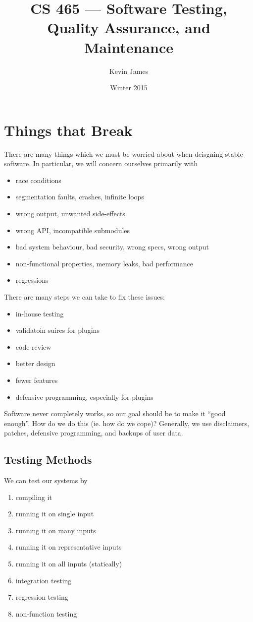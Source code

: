 \documentclass[12pt]{article}
\begin{document}
\title{CS 465 --- Software Testing, Quality Assurance, and Maintenance}
\author{Kevin James}
\date{\vspace{-2ex}Winter 2015}
\maketitle\HRule

\tableofcontents
\newpage

\section{Things that Break}
There are many things which we must be worried about when deisgning stable software. In particular, we will concern ourselves primarily with
\begin{itemize}
\item race conditions
\item segmentation faults, crashes, infinite loops
\item wrong output, unwanted side-effects
\item wrong API, incompatible submodules
\item bad system behaviour, bad security, wrong specs, wrong output
\item non-functional properties, memory leaks, bad performance
\item regressions
\end{itemize}

There are many steps we can take to fix these issues:
\begin{itemize}
\item in-house testing
\item validatoin suires for plugins
\item code review
\item better design
\item fewer features
\item defensive programming, especially for plugins
\end{itemize}

Software never completely works, so our goal should be to make it ``good enough''. How do we do this (ie. how do we cope)? Generally, we use disclaimers, patches, defensive programming, and backups of user data.

\subsection{Testing Methods}
We can test our systems by
\begin{enumerate}
\item compiling it
\item running it on single input
\item running it on many inputs
\item running it on representative inputs
\item running it on all inputs (statically)
\item integration testing
\item regression testing
\item non-function testing
\end{enumerate}
\end{document}
